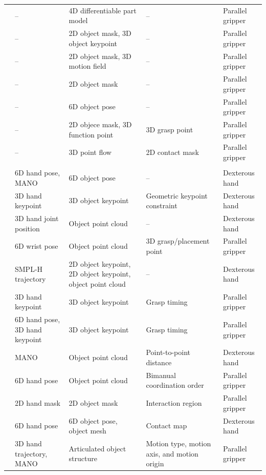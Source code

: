 \documentclass[Afour,sageh,times]{sagej}
\begin{document}
\begin{table}[t]
\begin{tabularx}{\linewidth}{p{2.9cm}X X p{4.5cm} p{1.7cm}}
\cite{kerr2024robot} & -- & 4D differentiable part model & -- & Parallel gripper \\
\cite{li2025novaflow} & -- & 2D object mask, 3D object keypoint & -- & Parallel gripper \\
\cite{yin2025object} & -- & 2D object mask, 3D motion field & -- & Parallel gripper \\
\cite{shan2025slot} & -- & 2D object mask & -- & Parallel gripper \\
\cite{hsu2025spot} & -- & 6D object pose & -- & Parallel gripper \\
\cite{tang2025functo} & -- & 2D objece mask, 3D function point & 3D grasp point & Parallel gripper \\
\cite{zhang2025actron3d} & -- & 3D point flow & 2D contact mask & Parallel gripper \\
\midrule
\rowcolor{gray!15}
\multicolumn{5}{l}{\textit{Interaction-centric policy grounding}} \\
\cite{qin2022dexmv} & 6D hand pose, MANO & 6D object pose & -- & Dexterous hand \\
\cite{gao2023k} & 3D hand keypoint & 3D object keypoint & Geometric keypoint constraint & Dexterous hand \\
\cite{ye2023learning} & 3D hand joint position & Object point cloud & -- & Dexterous hand \\
\cite{bahety2024screwmimic} & 6D wrist pose & Object point cloud & 3D grasp/placement point & Parallel gripper \\
\cite{li2024okami} & SMPL-H trajectory & 2D object keypoint, 2D object keypoint, object point cloud & -- & Dexterous hand \\
\cite{haldar2025point} & 3D hand keypoint & 3D object keypoint & Grasp timing & Parallel gripper \\
\cite{liu2025egozero} & 6D hand pose, 3D hand keypoint & 3D object keypoint & Grasp timing & Parallel gripper \\
\cite{chen2025web2grasp} & MANO & Object point cloud & Point-to-point distance & Dexterous hand \\
\cite{zhou2025you} & 6D hand pose & Object point cloud & Bimanual coordination order & Parallel gripper \\
\cite{heidinger20252handedafforder} & 2D hand mask & 2D object mask & Interaction region & Parallel gripper \\
\cite{chen2026dexterous} & 6D hand pose & 6D object pose, object mesh & Contact map & Dexterous hand \\
\cite{wang2026paws} & 3D hand trajectory, MANO & Articulated object structure & Motion type, motion axis, and motion origin & Parallel gripper \\
\bottomrule
\end{tabularx}
\end{table}
\end{document}
